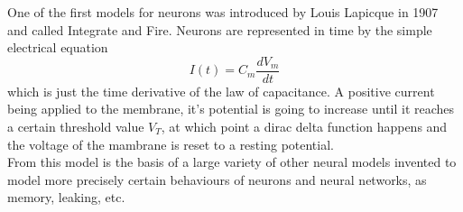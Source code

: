 One of the first models for neurons was introduced by Louis Lapicque in 1907 and called Integrate and Fire. Neurons are represented in time by the simple electrical equation
	\begin{equation}
		I(t)=C_m\frac{dV_m}{dt}
	\end{equation}
which is just the time derivative of the law of capacitance. A positive current being applied to the membrane, it's potential is going to increase until it reaches a certain threshold value $V_T$, at which point a dirac delta function happens and the voltage of the mambrane is reset to a resting potential.\\
From this model is the basis of a large variety of other neural models invented to model more precisely certain behaviours of neurons and neural networks, as memory, leaking, etc.